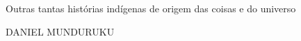 \begin{titlepage}
    \begin{center}

      \vspace*{8cm}
        \Huge
        \rmfamily
	Outras tantas histórias indígenas de origem das coisas e do universo

        \vspace*{2cm}
        \Huge
	DANIEL MUNDURUKU

      \end{center}
\end{titlepage}
